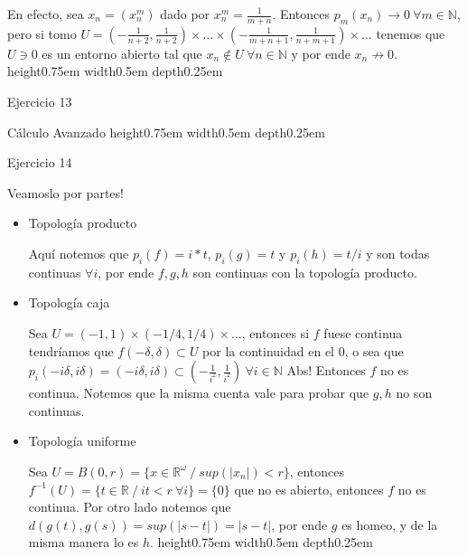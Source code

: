 \documentclass[11pt]{article}
\newcommand{\R}{{\mathbb{R}}}
\newcommand{\N}{{\mathbb{N}}}
\newcommand{\sett}[1]{\{#1\}}
\newenvironment{proof}[1][Demostraci\'on]{\begin{trivlist}
\item[\hskip \labelsep {\bfseries #1}]}{\end{trivlist}}
\newcommand{\qed}{\nobreak \ifvmode \relax \else
      \ifdim\lastskip<1.5em \hskip-\lastskip
      \hskip1.5em plus0em minus0.5em \fi \nobreak
      \vrule height0.75em width0.5em depth0.25em\fi}
\begin{document}
\begin{enumerate}
\begin{proof}
En efecto, sea $x_n = (x_{n}^{m})$ dado por $x_{n}^{m} = \frac{1}{m+n}$. Entonces $p_m(x_{n}) \rightarrow 0 \ \forall m \in \N$, pero si tomo $U = (-\frac{1}{n+2},\frac{1}{n+2}) \times \dots \times (-\frac{1}{m+n+1},\frac{1}{n+m+1}) \times \dots$ tenemos que $U \ni 0$ es un entorno abierto tal que $x_n \not \in U \ \forall n \in \N$ y por ende $x_n \not \rightarrow 0$. \qed

\end{proof}

\item {Ejercicio 13}

\begin{proof}

C\'alculo Avanzado \qed

\end{proof}

\item {Ejercicio 14}

\begin{proof}

Veamoslo por partes!

\begin{itemize}

\item {Topolog\'ia producto}


Aqu\'i notemos que $p_i (f) = i*t$, $p_i(g) = t$ y $p_i(h) = t/i$ y son todas continuas $\forall i$, por ende $f,g,h$ son continuas con la topolog\'ia producto.

\item {Topolog\'ia caja}

Sea $U = (-1,1) \times (-1/4,1/4) \times \dots$, entonces si $f$ fuese continua tendr\'iamos que $f(-\delta,\delta) \subset U$ por la continuidad en el 0, o sea que $p_i (-i\delta,i\delta) = (-i\delta,i\delta) \subset (-\frac{1}{i^2},\frac{1}{i^2}) \ \forall i \in \N$ Abs! Entonces $f$ no es continua. Notemos que la misma cuenta vale para probar que $g,h$ no son continuas.

\item {Topolog\'ia uniforme}

Sea $U = B(0,r) = \sett{x \in \R^{\omega} \ / \ sup(|x_n|) < r}$, entonces $f^{-1}(U)= \sett{t \in \R \ / \ it < r \ \forall i} = \sett{0}$ que no es abierto, entonces $f$ no es continua.
Por otro lado notemos que $d(g(t),g(s)) = sup(|s-t|) = |s-t|$, por ende $g$ es homeo, y de la misma manera lo es $h$. \qed

\end{itemize}


\end{proof}
\end{enumerate}
\end{document}
